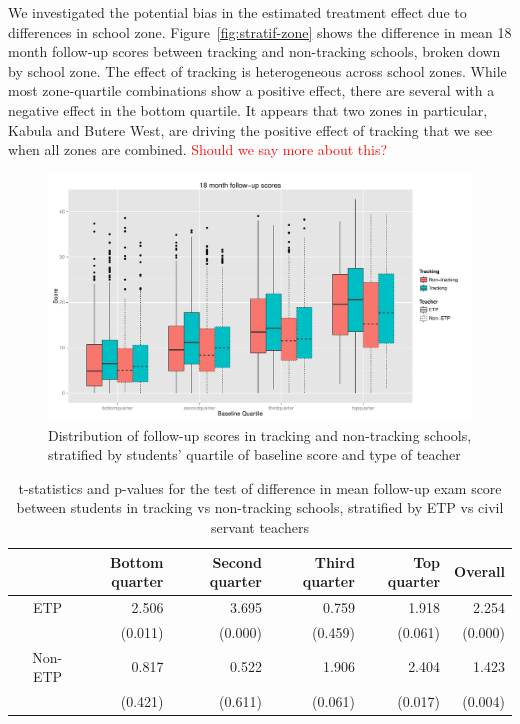 \documentclass[11pt]{article}
\begin{document}
We investigated the potential bias in the estimated treatment effect due to differences in school zone.  Figure~\ref{fig:stratif-zone} shows the difference in mean 18 month follow-up scores between tracking and non-tracking schools, broken down by school zone.  The effect of tracking is heterogeneous across school zones.  While most zone-quartile combinations show a positive effect,  there are several with a negative effect in the bottom quartile.  It appears that two zones in particular, Kabula and Butere West, are driving the positive effect of tracking that we see when all zones are combined. \textcolor{red}{Should we say more about this?}

 
 \begin{figure}[H]
 \centering
 \includegraphics[scale=0.5]{tracking-etp-stratif.pdf}
 \caption{Distribution of follow-up scores in tracking and non-tracking schools, stratified by students' quartile of baseline score and type of teacher}
 \label{fig:tracking-etp}
 \end{figure}
 

\begin{table}[ht]
\centering
\begin{tabular}{rrrrrr}
  \hline
 & Bottom quarter & Second quarter & Third quarter & Top quarter & Overall \\ 
  \hline
  ETP & 2.506 & 3.695 & 0.759 & 1.918 & 2.254 \\ 
   & (0.011) & (0.000) & (0.459) & (0.061) & (0.000) \\ 
  Non-ETP & 0.817 & 0.522 & 1.906 & 2.404 & 1.423 \\ 
   & (0.421) & (0.611) & (0.061) & (0.017) & (0.004) \\ 
   \hline
\end{tabular}
\caption{t-statistics and p-values for the test of difference in mean follow-up exam score between students in tracking vs non-tracking schools, stratified by ETP vs civil servant teachers}  \label{tab:tracking-etp}
\end{table} %
\end{document}
